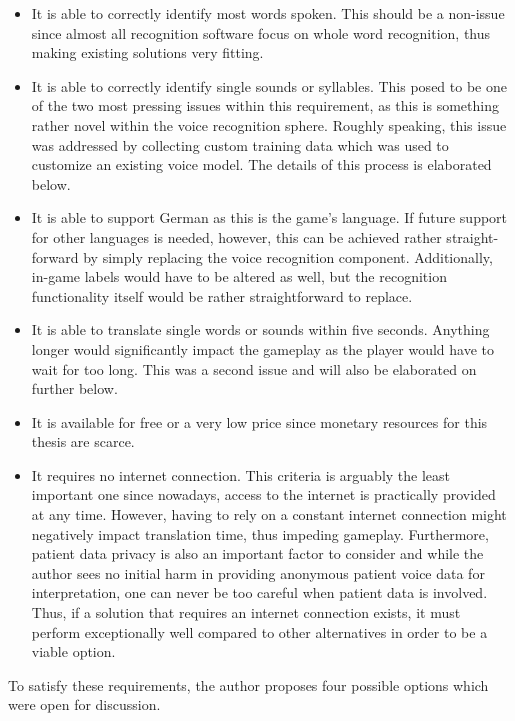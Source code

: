 \documentclass[draft,final]{vutinfth} %
\begin{document}
\begin{itemize}
\item It is able to correctly identify most words spoken. This should be a non-issue since almost all recognition software focus on whole word recognition, thus making existing solutions very fitting.
\item It is  able to correctly identify single sounds or syllables. This posed to be one of the two most pressing issues within this requirement, as this is something rather novel within the voice recognition sphere. Roughly speaking, this issue was addressed by collecting custom training data which was used to customize an existing voice model. The details of this process is elaborated below.
\item It is able to support German as this is the game's language. If future support for other languages is needed, however, this can be achieved rather straight-forward by simply replacing the voice recognition component. Additionally, in-game labels would have to be altered as well, but the recognition functionality itself would be rather straightforward to replace.
\item It is able to translate single words or sounds within five seconds. Anything longer would significantly impact the gameplay as the player would have to wait for too long. This was a second issue and will also be elaborated on further below.
\item It is available for free or a very low price since monetary resources for this thesis are scarce.
\item It requires no internet connection. This criteria is arguably the least important one since nowadays, access to the internet is practically provided at any time. However, having to rely on a constant internet connection might negatively impact translation time, thus impeding gameplay. Furthermore, patient data privacy is also an important factor to consider and while the author sees no initial harm in providing anonymous patient voice data for interpretation, one can never be too careful when patient data is involved. Thus, if a solution that requires an internet connection exists, it must perform exceptionally well compared to other alternatives in order to be a viable option. 
\end{itemize}

To satisfy these requirements, the author proposes four possible options which were open for discussion.
\end{document}
